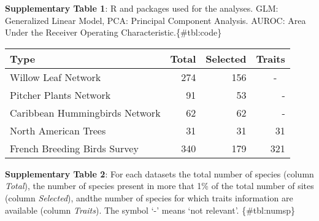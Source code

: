 \textbf{Supplementary Table 1}: R and packages used for the analyses.
GLM: Generalized Linear Model, PCA: Principal Component Analysis. AUROC:
Area Under the Receiver Operating Characteristic.\{\#tbl:code\}

\begin{longtable}[]{@{}lrrr@{}}
\toprule
Type & Total & Selected & Traits\tabularnewline
\midrule
\endhead
Willow Leaf Network & 274 & 156 & - ~\tabularnewline
Pitcher Plants Network & 91 & 53 & -\tabularnewline
Caribbean Hummingbirds Network & 62 & 62 & -\tabularnewline
North American Trees & 31 & 31 & 31\tabularnewline
French Breeding Birds Survey & 340 & 179 & 321\tabularnewline
\bottomrule
\end{longtable}

\textbf{Supplementary Table 2}: For each datasets the total number of
species (column \emph{Total}), the number of species present in more
that 1\% of the total number of sites (column \emph{Selected}), andthe
number of species for which traits information are available (column
\emph{Traits}). The symbol `-' means `not relevant'. \{\#tbl:numsp\}

